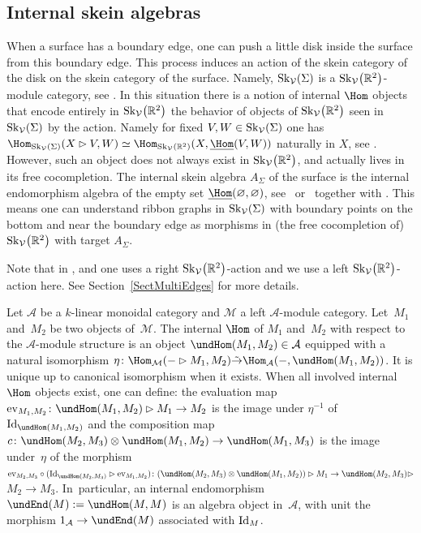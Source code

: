 \subsection{Internal skein algebras}\label{SectASigma}
When a surface has a boundary edge, one can push a little disk inside the surface from this boundary edge. This process induces an action of the skein category of the disk on the skein category of the surface. Namely, ${\rm Sk}_\mathcal{V}(\Sigma)$ is a ${\rm Sk}_\mathcal{V}\big(\mathbb{R}^2\big)$-module category, see \cite[Sections~3.2]{Cooke}. In this situation there is a notion of internal $\Hom$ objects that encode entirely in ${\rm Sk}_\mathcal{V}\big(\mathbb{R}^2\big)$ the behavior of objects of ${\rm Sk}_\mathcal{V}\big(\mathbb{R}^2\big)$ seen in ${\rm Sk}_\mathcal{V}(\Sigma)$ by the action. Namely for fixed $V,W \in {\rm Sk}_\mathcal{V}(\Sigma)$ one has $\Hom_{{\rm Sk}_\mathcal{V}(\Sigma)}(X \rhd V,W) \simeq \Hom_{{\rm Sk}_\mathcal{V}(\mathbb{R}^2)}(X, \underline{\Hom}(V,W))$ naturally in $X$, see \cite[Section~7.9]{EGNO}. However, such an object does not always exist in ${\rm Sk}_\mathcal{V}\big(\mathbb{R}^2\big)$, and actually lives in its free cocompletion. The internal skein algebra $A_\Sigma$ of the surface is the internal endomorphism algebra of the empty set $\underline{\Hom}(\varnothing,\varnothing)$, see~\cite{Gunningham} or~\cite{BBJ} together with \cite{Cooke}. This means one can understand ribbon graphs in ${\rm Sk}_\mathcal{V}(\Sigma)$ with boundary points on the bottom and near the boundary edge as morphisms in (the free cocompletion of) ${\rm Sk}_\mathcal{V}\big(\mathbb{R}^2\big)$ with target $A_\Sigma$.

Note that in \cite{Cooke}, \cite{BBJ} and \cite{Gunningham} one uses a right ${\rm Sk}_\mathcal{V}\big(\mathbb{R}^2\big)$-action and we use a left ${\rm Sk}_\mathcal{V}\big(\mathbb{R}^2\big)$-action here. See Section~\ref{SectMultiEdges} for more details.

\begin{Definition}\label{algStrOnIntHom}
Let $\mathcal{A}$ be a $k$-linear monoidal category and $\mathcal{M}$ a left $\mathcal{A}$-module category. Let~$M_1$ and~$M_2$ be two objects of~$\mathcal{M}$. The internal $\Hom$ of $M_1$ and~$M_2$ with respect to the $\mathcal{A}$-module structure is an object $\undHom(M_1,M_2)\in \mathcal{A}$
equipped with a natural isomorphism $\eta\colon \Hom_\mathcal{M}(-\rhd M_1,M_2) \tilde{\to} \Hom_\mathcal{A}(-,\undHom(M_1,M_2))$. It is unique up to canonical isomorphism when it exists.
When all involved internal $\Hom$ objects exist, one can define: the eva\-lua\-tion map ${\rm ev}_{M_1,M_2}\colon \undHom(M_1,M_2) \rhd M_1\to M_2$ is the image under $\eta^{-1}$ of ${\rm Id}_{\undHom(M_1,M_2)}$ and the composition map $c\colon \undHom(M_2,M_3) \otimes \undHom(M_1,M_2) \to \undHom(M_1,M_3)$ is the image under~$\eta$ of the morphism ${\rm ev}_{M_2,M_3} \circ ({\rm Id}_{\undHom(M_2,M_3)} \rhd {\rm ev}_{M_1,M_2})\colon (\undHom(M_2,M_3) \otimes \undHom(M_1,M_2))\rhd M_1 \to \undHom(M_2,M_3) \rhd$ $M_2\to M_3$.
In~particular, an internal endomorphism $\undEnd(M) := \undHom(M,M)$ is an algebra object in~$\mathcal{A}$, with unit the morphism $1_\mathcal{A} \to \undEnd(M)$ associated with ${\rm Id}_M$.
\end{Definition}

